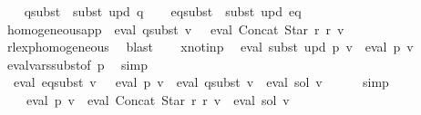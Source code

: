 \begin{isabellebody}
\ \ \isamarkupfalse%
\ {\isacharquery}{\kern0pt}q{\isacharunderscore}{\kern0pt}subst\ {\isacharequal}{\kern0pt}\ {\isachardoublequoteopen}subst\ {\isacharquery}{\kern0pt}upd\ q{\isachardoublequoteclose}\isanewline
\ \ \isamarkupfalse%
\ {\isacharquery}{\kern0pt}eq{\isacharunderscore}{\kern0pt}subst\ {\isacharequal}{\kern0pt}\ {\isachardoublequoteopen}subst\ {\isacharquery}{\kern0pt}upd\ eq{\isachardoublequoteclose}\isanewline
\ \ \isamarkupfalse%
\ homogeneous{\isacharunderscore}{\kern0pt}app{\isacharcolon}{\kern0pt}\ {\isachardoublequoteopen}{\isasymPsi}\ {\isacharparenleft}{\kern0pt}eval\ {\isacharquery}{\kern0pt}q{\isacharunderscore}{\kern0pt}subst\ v{\isacharparenright}{\kern0pt}\ {\isasymsubseteq}\ {\isasymPsi}\ {\isacharparenleft}{\kern0pt}eval\ {\isacharparenleft}{\kern0pt}Concat\ {\isacharparenleft}{\kern0pt}Star\ {\isacharquery}{\kern0pt}r{\isacharparenright}{\kern0pt}\ {\isacharquery}{\kern0pt}r{\isacharparenright}{\kern0pt}\ v{\isacharparenright}{\kern0pt}{\isachardoublequoteclose}\isanewline
\ \ \ \ \isamarkupfalse%
\ rlexp{\isacharunderscore}{\kern0pt}homogeneous\ \isamarkupfalse%
\ blast\isanewline
\ \ \isamarkupfalse%
\ x{\isacharunderscore}{\kern0pt}not{\isacharunderscore}{\kern0pt}in{\isacharunderscore}{\kern0pt}p\ \isamarkupfalse%
\ {\isachardoublequoteopen}eval\ {\isacharparenleft}{\kern0pt}subst\ {\isacharquery}{\kern0pt}upd\ p{\isacharparenright}{\kern0pt}\ v\ {\isacharequal}{\kern0pt}\ eval\ p\ v{\isachardoublequoteclose}\ \isamarkupfalse%
\ eval{\isacharunderscore}{\kern0pt}vars{\isacharunderscore}{\kern0pt}subst{\isacharbrackleft}{\kern0pt}of\ p{\isacharbrackright}{\kern0pt}\ \isamarkupfalse%
\ simp\isanewline
\ \ \isamarkupfalse%
\ \isamarkupfalse%
\ {\isachardoublequoteopen}{\isasymPsi}\ {\isacharparenleft}{\kern0pt}eval\ {\isacharquery}{\kern0pt}eq{\isacharunderscore}{\kern0pt}subst\ v{\isacharparenright}{\kern0pt}\ {\isacharequal}{\kern0pt}\ {\isasymPsi}\ {\isacharparenleft}{\kern0pt}eval\ p\ v\ {\isasymunion}\ eval\ {\isacharquery}{\kern0pt}q{\isacharunderscore}{\kern0pt}subst\ v\ {\isacharat}{\kern0pt}{\isacharat}{\kern0pt}\ eval\ sol\ v{\isacharparenright}{\kern0pt}{\isachardoublequoteclose}\isanewline
\ \ \ \ \isamarkupfalse%
\ simp\isanewline
\ \ \isamarkupfalse%
\ \isamarkupfalse%
\ {\isachardoublequoteopen}{\isasymdots}\ {\isasymsubseteq}\ {\isasymPsi}\ {\isacharparenleft}{\kern0pt}eval\ p\ v\ {\isasymunion}\ eval\ {\isacharparenleft}{\kern0pt}Concat\ {\isacharparenleft}{\kern0pt}Star\ {\isacharquery}{\kern0pt}r{\isacharparenright}{\kern0pt}\ {\isacharquery}{\kern0pt}r{\isacharparenright}{\kern0pt}\ v\ {\isacharat}{\kern0pt}{\isacharat}{\kern0pt}\ eval\ sol\ v{\isacharparenright}{\kern0pt}{\isachardoublequoteclose}\isanewline

\end{isabellebody}
